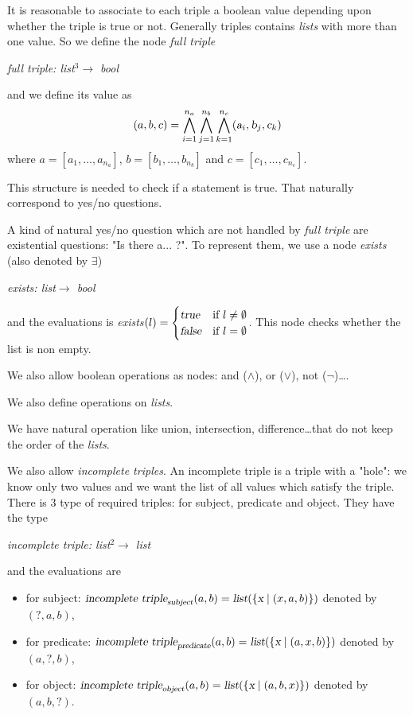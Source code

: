 It is reasonable to associate to each triple a boolean value depending upon whether the triple is true or not. Generally triples contains \textsl{lists} with more than one value. So we define the node \textsl{full triple} 
\begin{center}
\textsl{full triple: list$^3\rightarrow$ bool}
\end{center}
and we define its value as $$(a,b,c)=\bigwedge_{i=1}^{n_a}\bigwedge_{j=1}^{n_b}\bigwedge_{k=1}^{n_c} (\textsl{a}_i,\textsl{b}_j,\textsl{c}_k)$$where $a=[a_1,\ldots,a_{n_a}]$, $b=[b_1,\ldots,b_{n_b}]$ and $c=[c_1,\ldots,c_{n_c}]$.

This structure is needed to check if a statement is true. That naturally correspond to yes/no questions.

A kind of natural yes/no question which are not handled by \textsl{full triple} are existential questions: "Is there a... ?". To represent them, we use a node \textsl{exists} (also denoted by $\exists$)
\begin{center}
\textsl{exists: list$\rightarrow$ bool}
\end{center}
and the evaluations is \textsl{exists$(l) = \begin{cases}
\textsl{true} & \text{if }l\neq\emptyset\\
\textsl{false} & \text{if }l=\emptyset
\end{cases}$}. This node checks whether the list is non empty.

We also allow boolean operations as nodes: and ($\wedge$), or ($\vee$), not ($\neg$)\dots.

\bigskip

We also define operations on \textsl{lists}.

We have natural operation like union, intersection, difference\ldots that do not keep the order of the \textsl{lists}.

We also allow \textsl{incomplete triples}. An incomplete triple is a triple with a "hole": we know only two values and we want the list of all values which satisfy the triple. There is 3 type of required triples: for subject, predicate and object. They have the type
\begin{center}
\textsl{incomplete triple: list$^2\rightarrow$ list}
\end{center}
and the evaluations are
\begin{itemize}
    \item for subject: $\textsl{incomplete triple}_{\textsl{subject}}(a,b) = \textsl{list}(\{\textsl{x}\mid(x,a,b)\})$ denoted by $(?,a,b)$,
    \item for predicate: $\textsl{incomplete triple}_{\textsl{predicate}}(a,b) = \textsl{list}(\{\textsl{x}\mid(a,x,b)\})$ denoted by $(a,?,b)$,
    \item for object: $\textsl{incomplete triple}_{\textsl{object}}(a,b) = \textsl{list}(\{\textsl{x}\mid(a,b,x)\})$ denoted by $(a,b,?)$.
\end{itemize}

